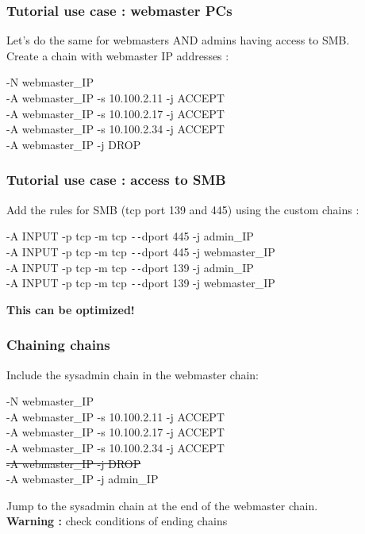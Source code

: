 \documentclass[14pt]{beamer}
\newcommand{\dd}{{\texttt{-{}-}}}
\begin{document}
  \begin{frame}
    \frametitle{Tutorial use case : webmaster PCs}
    Let's do the same for webmasters AND admins having access to SMB.\\
    \pause
    Create a chain with webmaster IP addresses :
    \begin{example}
      \small{-N webmaster\_IP\\
      -A webmaster\_IP -s 10.100.2.11 -j ACCEPT\\
      -A webmaster\_IP -s 10.100.2.17 -j ACCEPT\\
      -A webmaster\_IP -s 10.100.2.34 -j ACCEPT\\
      -A webmaster\_IP -j DROP}
    \end{example}
  \end{frame}
  \begin{frame}
    \frametitle{Tutorial use case : access to SMB}
    Add the rules for SMB (tcp port 139 and 445) using the custom chains :
    \begin{example}
      \small{-A INPUT -p tcp -m tcp \dd dport 445 -j admin\_IP\\
      -A INPUT -p tcp -m tcp \dd dport 445 -j webmaster\_IP\\
      -A INPUT -p tcp -m tcp \dd dport 139 -j admin\_IP\\
      -A INPUT -p tcp -m tcp \dd dport 139 -j webmaster\_IP}
    \end{example}
  \pause
  \textbf{This can be optimized!}
  \end{frame}
  \begin{frame}
    \frametitle{Chaining chains}
    Include the sysadmin chain in the webmaster chain:
    \begin{example}
      \small{-N webmaster\_IP\\
      -A webmaster\_IP -s 10.100.2.11 -j ACCEPT\\
      -A webmaster\_IP -s 10.100.2.17 -j ACCEPT\\
      -A webmaster\_IP -s 10.100.2.34 -j ACCEPT\\
      \sout{{\color{red}-A webmaster\_IP -j DROP}}\\
      {\color{blue}-A webmaster\_IP -j admin\_IP}}
    \end{example}
    Jump to the sysadmin chain at the end of the webmaster chain.\\
    \textbf{Warning :} check conditions of ending chains
  \end{frame}
\end{document}
